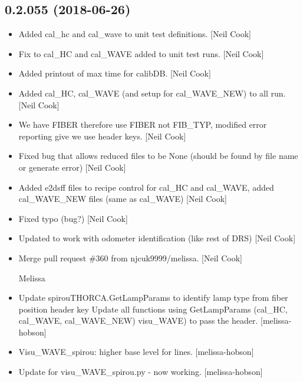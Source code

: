 \documentclass[a4paper,10pt,english]{report}
\begin{document}
\subsection{0.2.055 (2018-06-26)}
\label{\detokenize{misc/changelog:id408}}\begin{itemize}
\item {} 
Added cal\_hc and cal\_wave to unit test definitions. {[}Neil Cook{]}

\item {} 
Fix to cal\_HC and cal\_WAVE added to unit test runs. {[}Neil Cook{]}

\item {} 
Added printout of max time for calibDB. {[}Neil Cook{]}

\item {} 
Added cal\_HC, cal\_WAVE (and setup for cal\_WAVE\_NEW) to all run. {[}Neil
Cook{]}

\item {} 
We have FIBER therefore use FIBER not FIB\_TYP, modified error
reporting give we use header keys. {[}Neil Cook{]}

\item {} 
Fixed bug that allows reduced files to be None (should be found by
file name or generate error) {[}Neil Cook{]}

\item {} 
Added e2dsff files to recipe control for cal\_HC and cal\_WAVE, added
cal\_WAVE\_NEW files (same as cal\_WAVE) {[}Neil Cook{]}

\item {} 
Fixed typo (bug?) {[}Neil Cook{]}

\item {} 
Updated to work with odometer identification (like rest of DRS) {[}Neil
Cook{]}

\item {} 
Merge pull request \#360 from njcuk9999/melissa. {[}Neil Cook{]}

Melissa

\item {} 
Update spirouTHORCA.GetLampParams to identify lamp type from fiber
position header key Update all functions using GetLampParams (cal\_HC,
cal\_WAVE, cal\_WAVE\_NEW) visu\_WAVE) to pass the header. {[}melissa-
hobson{]}

\item {} 
Visu\_WAVE\_spirou: higher base level for lines. {[}melissa-hobson{]}

\item {} 
Update for visu\_WAVE\_spirou.py - now working. {[}melissa-hobson{]}


\end{itemize}
\end{document}
